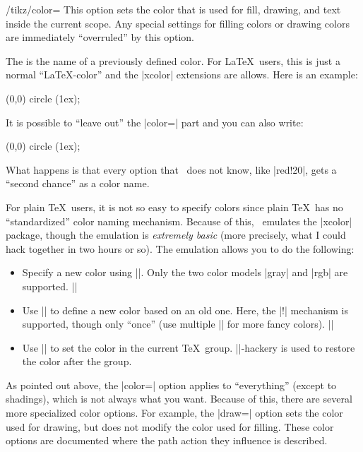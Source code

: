 \begin{key}{/tikz/color=}
  This option sets the color that is used for fill, drawing, and text
  inside the current scope. Any special settings for filling colors or
  drawing colors are immediately ``overruled'' by this option.

  The  is the name of a previously defined color. For
  \LaTeX\ users, this is just a normal ``\LaTeX-color'' and the
  |xcolor| extensions are allows. Here is an example:

\begin{codeexample}[]
\tikz \fill[color=red!20] (0,0) circle (1ex);
\end{codeexample}

  It is possible to ``leave out'' the |color=| part and you can also
  write:
\begin{codeexample}[]
\tikz \fill[red!20] (0,0) circle (1ex);
\end{codeexample}
  What happens is that every option that \tikzname\ does not know, like
  |red!20|, gets a ``second chance'' as a color name.

  For plain \TeX\ users, it is not so easy to specify colors since
  plain \TeX\ has no ``standardized'' color naming
  mechanism. Because of this, \pgfname\ emulates the |xcolor| package,
  though the emulation is \emph{extremely basic} (more precisely, what
  I could hack together in two hours or so). The emulation allows you
  to do the following:
  \begin{itemize}
  \item Specify a new color using |\definecolor|. Only the two color
    models |gray| and |rgb| are supported.
    \example ||
  \item Use || to define a new color based on an old
    one. Here, the |!| mechanism is supported, though only ``once''
    (use multiple || for more fancy colors).
    \example ||
  \item Use |\color| to set the color in the current
    \TeX\ group. |\aftergroup|-hackery is used to restore the color
    after the group.
  \end{itemize}
\end{key}

As pointed out above, the |color=| option applies to ``everything''
(except to shadings), which is not always what you want. Because of
this, there are several more specialized color options. For example,
the |draw=| option sets the color used for drawing, but does not
modify the color used for filling. These color options are documented
where the path action they influence is described.


